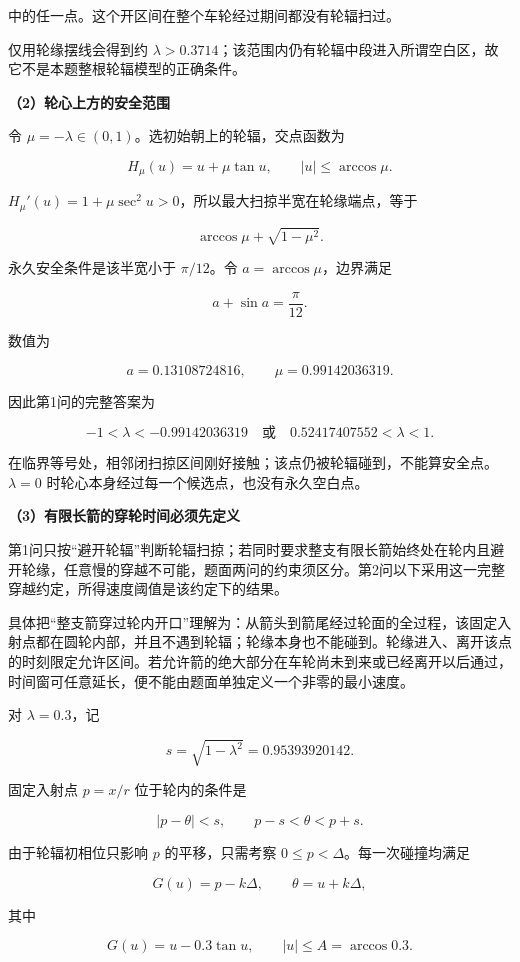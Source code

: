 \documentclass[12pt,a4paper,UTF8]{ctexart}
\begin{document}
中的任一点。这个开区间在整个车轮经过期间都没有轮辐扫过。

仅用轮缘摆线会得到约
\(\lambda>0.3714\)；该范围内仍有轮辐中段进入所谓空白区，故它不是本题整根轮辐模型的正确条件。

\textbf{（2）轮心上方的安全范围}

令 \(\mu=-\lambda\in(0,1)\)。选初始朝上的轮辐，交点函数为

\[H_\mu(u)=u+\mu\tan u,\qquad |u|\le\arccos\mu.\]

\(H_\mu'(u)=1+\mu\sec^2u>0\)，所以最大扫掠半宽在轮缘端点，等于

\[\arccos\mu+\sqrt{1-\mu^2}.\]

永久安全条件是该半宽小于 \(\pi/12\)。令 \(a=\arccos\mu\)，边界满足

\[a+\sin a=\frac\pi{12}.\]

数值为

\[a=0.13108724816,\qquad \mu=0.99142036319.\]

因此第1问的完整答案为

\[\boxed{-1<\lambda<-0.99142036319
\quad\text{或}\quad 0.52417407552<\lambda<1}.\]

在临界等号处，相邻闭扫掠区间刚好接触；该点仍被轮辐碰到，不能算安全点。\(\lambda=0\)
时轮心本身经过每一个候选点，也没有永久空白点。

\textbf{（3）有限长箭的穿轮时间必须先定义}

第1问只按``避开轮辐''判断轮辐扫掠；若同时要求整支有限长箭始终处在轮内且避开轮缘，任意慢的穿越不可能，题面两问的约束须区分。第2问以下采用这一完整穿越约定，所得速度阈值是该约定下的结果。

具体把``整支箭穿过轮内开口''理解为：从箭头到箭尾经过轮面的全过程，该固定入射点都在圆轮内部，并且不遇到轮辐；轮缘本身也不能碰到。轮缘进入、离开该点的时刻限定允许区间。若允许箭的绝大部分在车轮尚未到来或已经离开以后通过，时间窗可任意延长，便不能由题面单独定义一个非零的最小速度。

对 \(\lambda=0.3\)，记

\[s=\sqrt{1-\lambda^2}=0.95393920142.\]

固定入射点 \(p=x/r\) 位于轮内的条件是

\[|p-\theta|<s,\qquad p-s<\theta<p+s.\]

由于轮辐初相位只影响 \(p\) 的平移，只需考察
\(0\le p<\Delta\)。每一次碰撞均满足

\[G(u)=p-k\Delta,\qquad \theta=u+k\Delta,\]

其中

\[G(u)=u-0.3\tan u,\qquad |u|\le A=\arccos0.3.\]
\end{document}
